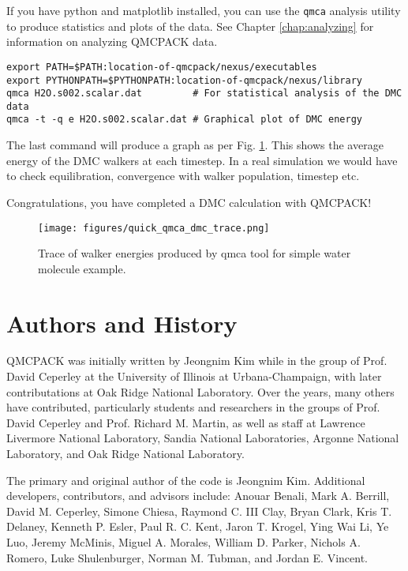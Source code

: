 If you have python and matplotlib installed, you can use the
\texttt{qmca} analysis utility to produce statistics and plots of the
data. See Chapter \ref{chap:analyzing} for information on analyzing
QMCPACK data.
\begin{verbatim}
export PATH=$PATH:location-of-qmcpack/nexus/executables 
export PYTHONPATH=$PYTHONPATH:location-of-qmcpack/nexus/library
qmca H2O.s002.scalar.dat         # For statistical analysis of the DMC data
qmca -t -q e H2O.s002.scalar.dat # Graphical plot of DMC energy
\end{verbatim}

The last command will produce a graph as per
Fig. \ref{fig:quick_qmca_dmc_trace}. This shows the average energy of
the DMC walkers at each timestep. In a real simulation we would have
to check equilibration, convergence with walker population, timestep etc.

Congratulations, you have completed a DMC calculation with QMCPACK!

\begin{figure}
  \centering
  \texttt{[image: figures/quick\_qmca\_dmc\_trace.png]}
  \caption{Trace of walker energies produced by qmca tool for simple
    water molecule example.}
  \label{fig:quick_qmca_dmc_trace}
\end{figure}

\section{Authors and History}
\label{sec:history}
QMCPACK was initially written by Jeongnim Kim while in the group of
Prof. David Ceperley at the University of Illinois at
Urbana-Champaign, with later contributations at Oak Ridge National Laboratory. Over the years, many others have contributed, particularly
students and researchers in the groups of Prof. David Ceperley
and Prof. Richard M. Martin, as well as staff at Lawrence Livermore
National Laboratory, Sandia National Laboratories, Argonne National
Laboratory, and Oak Ridge National Laboratory.

The primary and original author of the code is Jeongnim
Kim. Additional developers, contributors, and advisors include:
Anouar Benali,
Mark A. Berrill,  
David M. Ceperley, 
Simone Chiesa,
Raymond C. III Clay,
Bryan Clark,
Kris T. Delaney,
Kenneth P. Esler,
Paul R. C. Kent,
Jaron T. Krogel,
Ying Wai Li,
Ye Luo,
Jeremy McMinis,
Miguel A. Morales,
William D. Parker,
Nichols A. Romero,
Luke Shulenburger,
Norman M. Tubman,
and Jordan E. Vincent.


